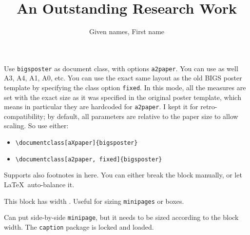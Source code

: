 \documentclass[a3paper]{bigsposter}
\author{Given names, First name}
\title{An Outstanding Research Work}
\institute{Famous Research Institute}
\newcommand{\emptybox}[2]{\framebox[#1]{\rule{0pt}{#2}}}
\begin{document}
  \maketitle
  \begin{blockrow}
    Use \texttt{bigsposter} as document class, with options \texttt{a2paper}. You can use as well A3, A4, A1, A0, etc. You can use the exact same layout as the old BIGS poster template by specifying the class option \texttt{fixed}. In this mode, all the measures are set with the exact size as it was specified in the original poster template, which means in particular they are hardcoded for \texttt{a2paper}. I kept it for retro-compatibility; by default, all parameters are relative to the paper size to allow scaling. So use either:
    \begin{itemize}
      \item \verb|\documentclass[aXpaper]{bigsposter}|
      \item \verb|\documentclass[a2paper, fixed]{bigsposter}|
    \end{itemize}
    \textcolor{lightgray}{\lipsum[2]}
  \blockbreak
    Supports also footnotes in here.
    You can either break the block manually, or let \LaTeX~auto-balance it.

    This block has width \the\blockwidth. Useful for sizing \texttt{minipages} or boxes.\\
    \textcolor{lightgray}{\lipsum[1]}
    \begin{minipage}[t]{0.3\blockwidth}
      Can put side-by-side \texttt{minipage}, but it needs to be sized according to the block width. The \texttt{caption} package is locked and loaded.
    \end{minipage}
    \begin{minipage}[t]{0.7\blockwidth}
      \begin{blockfigure}
        \emptybox{0.9\textwidth}{4em}
      \end{blockfigure}
    \end{minipage}
  \end{blockrow}
\end{document}
